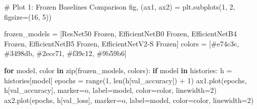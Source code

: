 \documentclass[
  letterpaper,
  DIV=11,
  numbers=noendperiod]{scrartcl}
\newenvironment{Shaded}{\begin{snugshade}}{\end{snugshade}}
\newcommand{\BuiltInTok}[1]{\textcolor[rgb]{0.00,0.23,0.31}{#1}}
\newcommand{\CommentTok}[1]{\textcolor[rgb]{0.37,0.37,0.37}{#1}}
\newcommand{\ControlFlowTok}[1]{\textcolor[rgb]{0.00,0.23,0.31}{\textbf{#1}}}
\newcommand{\DecValTok}[1]{\textcolor[rgb]{0.68,0.00,0.00}{#1}}
\newcommand{\KeywordTok}[1]{\textcolor[rgb]{0.00,0.23,0.31}{\textbf{#1}}}
\newcommand{\NormalTok}[1]{\textcolor[rgb]{0.00,0.23,0.31}{#1}}
\newcommand{\OperatorTok}[1]{\textcolor[rgb]{0.37,0.37,0.37}{#1}}
\newcommand{\StringTok}[1]{\textcolor[rgb]{0.13,0.47,0.30}{#1}}
\renewenvironment{Shaded}{%
  \begin{tcolorbox}[%
    enhanced,%
    colback=codebg,%
    colframe=codebg,%
    borderline west={3pt}{0pt}{sectionblue},%
    boxrule=0pt,%
    arc=0pt,%
    boxsep=5pt,%
    left=2mm,%
    right=2mm,%
    top=2mm,%
    bottom=2mm%
  ]%
}{%
  \end{tcolorbox}%
}
\begin{document}
\begin{Shaded}
\begin{Highlighting}[]
\CommentTok{\# Plot 1: Frozen Baselines Comparison}
\NormalTok{fig, (ax1, ax2) }\OperatorTok{=}\NormalTok{ plt.subplots(}\DecValTok{1}\NormalTok{, }\DecValTok{2}\NormalTok{, figsize}\OperatorTok{=}\NormalTok{(}\DecValTok{16}\NormalTok{, }\DecValTok{5}\NormalTok{))}

\NormalTok{frozen\_models }\OperatorTok{=}\NormalTok{ [}\StringTok{\textquotesingle{}ResNet50 Frozen\textquotesingle{}}\NormalTok{, }
                 \StringTok{\textquotesingle{}EfficientNetB0 Frozen\textquotesingle{}}\NormalTok{, }
                 \StringTok{\textquotesingle{}EfficientNetB4 Frozen\textquotesingle{}}\NormalTok{, }
                 \StringTok{\textquotesingle{}EfficientNetB5 Frozen\textquotesingle{}}\NormalTok{, }
                 \StringTok{\textquotesingle{}EfficientNetV2{-}S Frozen\textquotesingle{}}\NormalTok{]}
\NormalTok{colors }\OperatorTok{=}\NormalTok{ [}\StringTok{\textquotesingle{}\#e74c3c\textquotesingle{}}\NormalTok{, }\StringTok{\textquotesingle{}\#3498db\textquotesingle{}}\NormalTok{, }\StringTok{\textquotesingle{}\#2ecc71\textquotesingle{}}\NormalTok{, }\StringTok{\textquotesingle{}\#f39c12\textquotesingle{}}\NormalTok{, }\StringTok{\textquotesingle{}\#9b59b6\textquotesingle{}}\NormalTok{]}

\ControlFlowTok{for}\NormalTok{ model, color }\KeywordTok{in} \BuiltInTok{zip}\NormalTok{(frozen\_models, colors):}
    \ControlFlowTok{if}\NormalTok{ model }\KeywordTok{in}\NormalTok{ histories:}
\NormalTok{        h }\OperatorTok{=}\NormalTok{ histories[model]}
\NormalTok{        epochs }\OperatorTok{=} \BuiltInTok{range}\NormalTok{(}\DecValTok{1}\NormalTok{, }\BuiltInTok{len}\NormalTok{(h[}\StringTok{\textquotesingle{}val\_accuracy\textquotesingle{}}\NormalTok{]) }\OperatorTok{+} \DecValTok{1}\NormalTok{)}
\NormalTok{        ax1.plot(epochs, h[}\StringTok{\textquotesingle{}val\_accuracy\textquotesingle{}}\NormalTok{], }
\NormalTok{                 marker}\OperatorTok{=}\StringTok{\textquotesingle{}o\textquotesingle{}}\NormalTok{, label}\OperatorTok{=}\NormalTok{model, color}\OperatorTok{=}\NormalTok{color, linewidth}\OperatorTok{=}\DecValTok{2}\NormalTok{)}
\NormalTok{        ax2.plot(epochs, h[}\StringTok{\textquotesingle{}val\_loss\textquotesingle{}}\NormalTok{], }
\NormalTok{                 marker}\OperatorTok{=}\StringTok{\textquotesingle{}o\textquotesingle{}}\NormalTok{, label}\OperatorTok{=}\NormalTok{model, color}\OperatorTok{=}\NormalTok{color, linewidth}\OperatorTok{=}\DecValTok{2}\NormalTok{)}


\end{Highlighting}
\end{Shaded}
\end{document}
